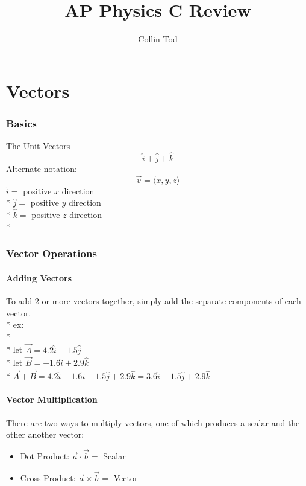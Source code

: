 \documentclass[a4paper,12pt]{article}
\title{AP Physics C Review}
\author{Collin Tod}
\begin{document}
\maketitle
\newpage
\tableofcontents
\newpage
{}

\part{Vectors}
		\section{Basics}
				The Unit Vectors
				\begin{equation*}
						\hat{i} + \hat{j} + \hat{k}
				\end{equation*}
				\noindent	
				Alternate notation:
				\begin{equation*}
						\vec{v} = \langle x,y,z\rangle
				\end{equation*}
				\noindent
				$\hat{i} =$ positive $x$ direction \\*
				$\hat{j} =$ positive $y$ direction \\*
				$\hat{k} =$ positive $z$ direction \\*
		\section{Vector Operations}
				\subsection{Adding Vectors}
						To add 2 or more vectors together, simply add the separate components of each vector. \\*
						ex:\\*\\*
						\indent let $\vec{A} = 4.2\hat{i} -1.5\hat{j}$\\* 
						\indent let $\vec{B} = -1.6\hat{i} +2.9\hat{k}$\\*
						\indent $\vec{A} + \vec{B} = 4.2\hat{i} - 1.6\hat{i} -1.5\hat{j} + 2.9\hat{k} = 3.6\hat{i} -1.5\hat{j} + 2.9\hat{k}$
				\subsection{Vector Multiplication}
						There are two ways to multiply vectors, one of which produces a scalar and the other another vector:
						\begin{itemize}
								\item Dot Product: $\vec{a} \cdot \vec{b} =$ Scalar
								\item Cross Product: $\vec{a} \times \vec{b}=$ Vector
						\end{itemize}
\end{document}
